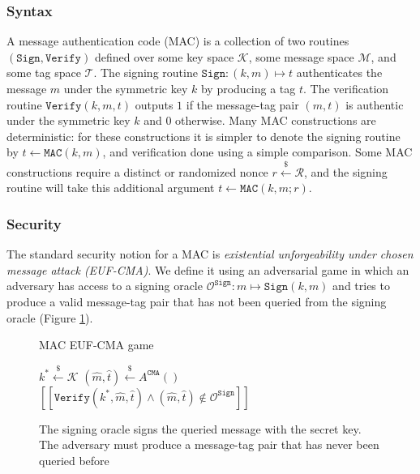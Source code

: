 \documentclass[runningheads]{llncs}
\newcommand{\mac}{\texttt{MAC}}
\newcommand{\sign}{\texttt{Sign}}
\newcommand{\verify}{\texttt{Verify}}
\newcommand{\leftsample}{\stackrel{\$}{\leftarrow}}
\newcommand{\llbrack}{[\![}
\newcommand{\rrbrack}{]\!]}
\begin{document}
\subsubsection{Syntax} A message authentication code (MAC) is a collection of two routines $(\sign, \verify)$ defined over some key space $\mathcal{K}$, some message space $\mathcal{M}$, and some tag space $\mathcal{T}$. The signing routine $\sign: (k, m) \mapsto t$ authenticates the message $m$ under the symmetric key $k$ by producing a tag $t$. The verification routine $\verify(k,m,t)$ outputs $1$ if the message-tag pair $(m, t)$ is authentic under the symmetric key $k$ and $0$ otherwise. Many MAC constructions are deterministic: for these constructions it is simpler to denote the signing routine by $t \leftarrow \mac(k, m)$, and verification done using a simple comparison. Some MAC constructions require a distinct or randomized nonce $r \leftsample \mathcal{R}$, and the signing routine will take this additional argument $t \leftarrow \mac(k, m; r)$.

\subsubsection{Security} The standard security notion for a MAC is \textit{existential unforgeability under chosen message attack (EUF-CMA)}. We define it using an adversarial game in which an adversary has access to a signing oracle $\mathcal{O}^\sign: m \mapsto \sign(k, m)$ and tries to produce a valid message-tag pair that has not been queried from the signing oracle (Figure \ref{fig:euf-cma-game}).

\begin{figure}[h]
    \centering
    \begin{minipage}[t]{0.6\textwidth}
    \begin{algorithm}[H]
        \caption*{MAC EUF-CMA game}
        \begin{algorithmic}[1]
            \State $k^\ast \leftsample \mathcal{K}$
            \State $(\hat{m}, \hat{t}) \leftsample A^\texttt{CMA}()$
            \State \Return $\llbrack \verify(k^\ast, \hat{m}, \hat{t}) \land (\hat{m}, \hat{t}) \not\in \mathcal{O}^\sign \rrbrack$
        \end{algorithmic}
    \end{algorithm}
    \end{minipage}
    \caption{The signing oracle signs the queried message with the secret key. The adversary must produce a message-tag pair that has never been queried before}\label{fig:euf-cma-game}
\end{figure}
\end{document}
